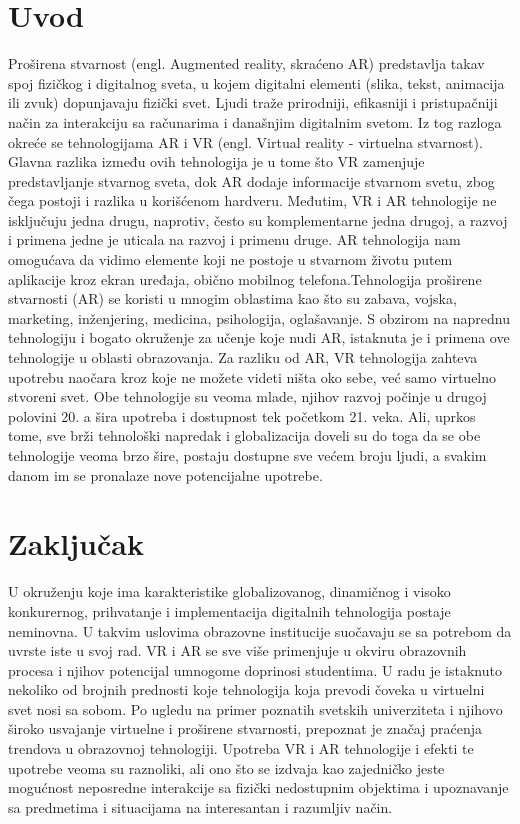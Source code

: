 \documentclass[a4paper]{article}
\begin{document}
	\section{Uvod}
	\label{sec:Uvod}
	Proširena stvarnost (engl. Augmented reality, skraćeno AR) predstavlja takav spoj fizičkog i digitalnog sveta, u kojem digitalni elementi (slika, tekst, 
	animacija ili zvuk) dopunjavaju fizički svet. Ljudi traže prirodniji, efikasniji i pristupačniji način za interakciju sa računarima i današnjim digitalnim 
	svetom. Iz tog razloga okreće se tehnologijama AR i VR (engl. Virtual reality - virtuelna stvarnost). Glavna razlika između ovih tehnologija je u tome što VR 
	zamenjuje predstavljanje stvarnog sveta, dok AR dodaje informacije stvarnom svetu, zbog čega postoji i razlika u korišćenom hardveru. Međutim, VR i AR 
	tehnologije ne isključuju jedna drugu, naprotiv, često su komplementarne jedna drugoj, a razvoj i primena jedne je uticala na razvoj i primenu druge. AR 
	tehnologija nam omogućava da vidimo elemente koji ne postoje u stvarnom životu putem aplikacije kroz ekran uređaja, obično mobilnog telefona.Tehnologija 
	proširene stvarnosti (AR) se koristi u mnogim oblastima kao što su zabava, vojska, marketing, inženjering, medicina, psihologija, oglašavanje. S obzirom na 
	naprednu tehnologiju i bogato okruženje za učenje koje nudi AR, istaknuta je i primena ove tehnologije u oblasti obrazovanja. Za razliku od AR, VR tehnologija 
	zahteva upotrebu naočara kroz koje ne možete videti ništa oko sebe, već samo virtuelno stvoreni svet. Obe tehnologije su veoma mlade, njihov razvoj počinje u 
	drugoj polovini 20. a šira upotreba i dostupnost tek početkom 21. veka. Ali, uprkos tome, sve brži tehnološki napredak i globalizacija doveli su do toga da se 
	obe tehnologije veoma brzo šire, postaju dostupne sve većem broju ljudi, a svakim danom im se pronalaze nove potencijalne upotrebe.
	
	\section{Zaključak}
	\label{sec:Zaključak}
	U okruženju koje ima karakteristike globalizovanog, dinamičnog i visoko  konkurernog, prihvatanje i implementacija digitalnih tehnologija postaje neminovna. U takvim uslovima obrazovne institucije suočavaju se sa potrebom da uvrste iste u svoj rad. VR i AR se sve više primenjuje u okviru obrazovnih procesa i njihov potencijal umnogome doprinosi studentima. U radu je istaknuto nekoliko od brojnih prednosti koje tehnologija koja prevodi čoveka u virtuelni svet nosi sa sobom. Po ugledu na primer poznatih svetskih univerziteta i njihovo široko usvajanje virtuelne i proširene stvarnosti, prepoznat je značaj praćenja trendova u obrazovnoj tehnologiji. Upotreba VR i AR tehnologije i efekti te upotrebe veoma su raznoliki, ali ono što se izdvaja kao zajedničko jeste mogućnost neposredne interakcije sa fizički nedostupnim objektima i upoznavanje sa predmetima i situacijama na interesantan i razumljiv način.
\end{document}

